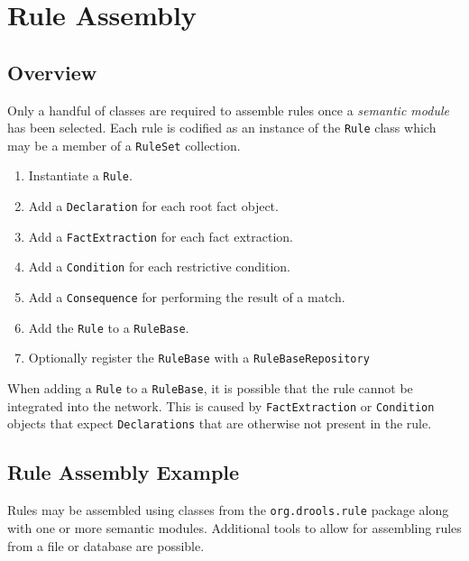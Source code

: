 
\chapter{Rule Assembly}

\section{Overview}

Only a handful of classes are required to assemble rules once a
\emph{semantic module} has been selected.  Each rule is codified as an
instance of the \verb|Rule| class which may be a member of a
\verb|RuleSet| collection.  

\begin{enumerate}
	\item Instantiate a \verb|Rule|.
	\item Add a \verb|Declaration| for each root fact object.
	\item Add a \verb|FactExtraction| for each fact extraction.
	\item Add a \verb|Condition| for each restrictive condition.
	\item Add a \verb|Consequence| for performing the result of a match.
	\item Add the \verb|Rule| to a \verb|RuleBase|.
	\item Optionally register the \verb|RuleBase| with a \verb|RuleBaseRepository|
\end{enumerate}

When adding a \verb|Rule| to a  \verb|RuleBase|, it is possible that
the rule cannot be integrated into the network.  This is caused
by \verb|FactExtraction| or \verb|Condition| objects that expect
\verb|Declarations| that are otherwise not present in the rule.

\newpage

\section{Rule Assembly Example}

Rules may be assembled using classes from the \verb|org.drools.rule|
package along with one or more semantic modules.  Additional tools
to allow for assembling rules from a file or database are possible.

